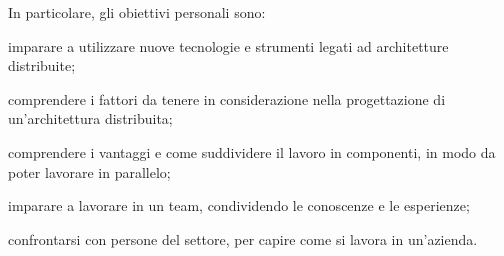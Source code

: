 \noindent In particolare, gli obiettivi personali sono:
\begin{list}{*}{}
    \item imparare a utilizzare nuove tecnologie e strumenti legati ad architetture distribuite;
    \item comprendere i fattori da tenere in considerazione nella progettazione di un'architettura distribuita;
    \item comprendere i vantaggi e come suddividere il lavoro in componenti, in modo da poter lavorare in parallelo;
    \item imparare a lavorare in un team, condividendo le conoscenze e le esperienze;
    \item confrontarsi con persone del settore, per capire come si lavora in un'azienda.
\end{list}
\newpage
\pagestyle{empty}
\null %

\newpage